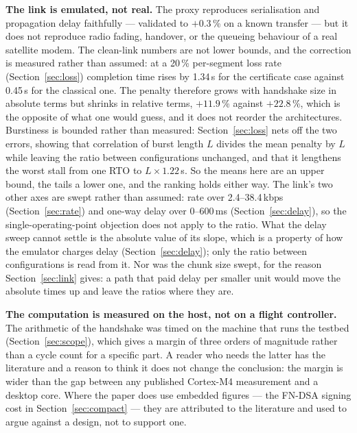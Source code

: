 \documentclass[drones,article,submit,pdftex,moreauthors]{Definitions/mdpi}
\newcommand{\kbps}{kbps}
\newcommand{\fndsa}{FN-DSA}
\begin{document}
\textbf{The link is emulated, not real.} The proxy reproduces
serialisation and propagation delay faithfully --- validated to
$+0.3$\,\% on a known transfer --- but it does not reproduce radio
fading, handover, or the queueing behaviour of a real satellite modem.
The clean-link numbers are not lower bounds, and the correction is
measured rather than assumed: at a 20\,\% per-segment loss rate
(Section~\ref{sec:loss}) completion time rises by 1.34\,s for the
certificate case against 0.45\,s for the classical one. The penalty
therefore grows with handshake size in absolute terms but shrinks in
relative terms, $+11.9$\,\% against $+22.8$\,\%, which is the
opposite of what one would guess, and it does not reorder the
architectures. Burstiness is bounded rather than measured:
Section~\ref{sec:loss} nets off the two errors, showing that correlation
of burst length $L$ divides the mean penalty by $L$ while leaving the
ratio between configurations unchanged, and that it lengthens the worst
stall from one RTO to $L \times 1.22$\,s. So the means here are an upper
bound, the tails a lower one, and the ranking holds either way. The link's
two other axes are swept rather than assumed: rate over 2.4--38.4\,\kbps{}
(Section~\ref{sec:rate}) and one-way delay over 0--600\,ms
(Section~\ref{sec:delay}), so the single-operating-point objection does
not apply to the ratio. What the delay sweep cannot settle is the
absolute value of its slope, which is a property of how the emulator
charges delay (Section~\ref{sec:delay}); only the ratio between
configurations is read from it. Nor was the chunk size swept, for the
reason Section~\ref{sec:link} gives: a path that paid delay per smaller
unit would move the absolute times up and leave the ratios where they
are.

\textbf{The computation is measured on the host, not on a flight
controller.} The arithmetic of the handshake was timed on the machine
that runs the testbed (Section~\ref{sec:scope}), which gives a margin of
three orders of magnitude rather than a cycle count for a specific part.
A reader who needs the latter has the literature \cite{pqm4,botros2019}
and a reason to think it does not change the conclusion: the margin is
wider than the gap between any published Cortex-M4 measurement and a
desktop core. Where the paper does use embedded figures --- the
\fndsa{} signing cost in Section~\ref{sec:compact} --- they are
attributed to the literature and used to argue against a design, not to
support one.
\end{document}
